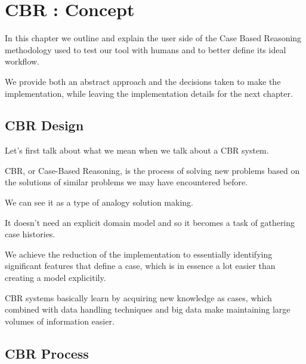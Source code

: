 %
%

\chapter{CBR : Concept}

\begin{resumen}
In this chapter we outline and explain the user side of the Case Based Reasoning methodology used to test our tool with humans and to better define its ideal workflow.

We provide both an abstract approach and the decisions taken to make the implementation, while leaving the implementation details for the next chapter.
\end{resumen}

\linespread{1.6}

\section{CBR Design}
\label{cap1:sec:introduccion}

Let's first talk about what we mean when we talk about a CBR system.

CBR, or Case-Based Reasoning, is the process of solving new problems based on the solutions of similar problems we may have encountered before.

We can see it as a type of analogy solution making.

It doesn't need an explicit domain model and so it becomes a task of gathering case histories. 

We achieve the reduction of the implementation to essentially identifying significant features that define a case, which is in essence a lot easier than creating a model explicitily. 

CBR systems basically learn by acquiring new knowledge as cases, which combined with data handling techniques and big data make maintaining large volumes of information easier.

\section{CBR Process}
\label{cap1:sec:process}

